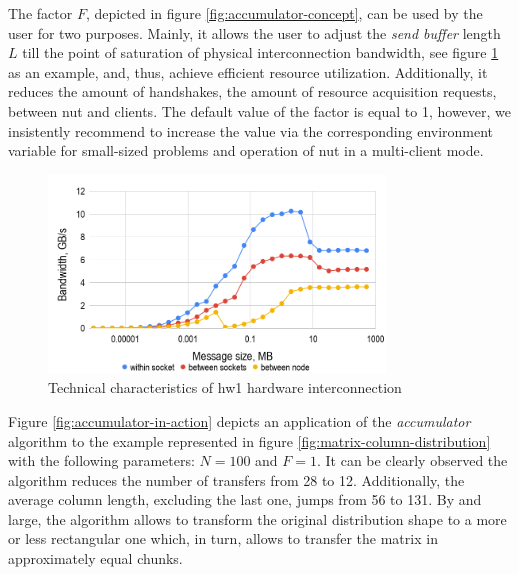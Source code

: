 The factor $F$, depicted in figure \ref{fig:accumulator-concept}, can be used by the user for two purposes. Mainly, it allows the user to adjust the \textit{send buffer} length $L$ till the point of saturation of physical interconnection bandwidth, see figure \ref{fig:hw1-bandwidth} as an example, and, thus, achieve efficient resource utilization. Additionally, it reduces the amount of handshakes, the amount of resource acquisition requests, between \gls{nut} and clients. The default value of the factor is equal to 1, however, we insistently recommend to increase the value via the corresponding environment variable for small-sized problems and operation of \gls{nut} in a multi-client mode.\\


\begin{figure}[htpb]
  \centering
  \includegraphics[width=0.8\textwidth]{figures/chapter-3/hw1-bandwidth.png}
  \caption{Technical characteristics of  \gls{hw1} hardware interconnection} \label{fig:hw1-bandwidth}
\end{figure}



Figure \ref{fig:accumulator-in-action} depicts an application of the \textit{accumulator} algorithm to the example represented in figure \ref{fig:matrix-column-distribution} with the following parameters: $N = 100$ and $F = 1$. It can be clearly observed the algorithm reduces the number of transfers from 28 to 12. Additionally, the average column length, excluding the last one, jumps from 56 to 131. By and large, the algorithm allows to transform the original distribution shape to a more or less rectangular one which, in turn, allows to transfer the matrix in approximately equal chunks.\\



